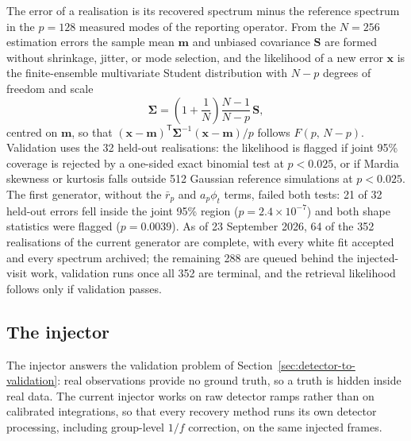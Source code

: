 The error of a realisation is its recovered spectrum minus the reference
spectrum in the $p=128$ measured modes of the reporting operator. From
the $N=256$ estimation errors the sample mean $\bm{m}$ and unbiased
covariance $\bm{S}$ are formed without shrinkage, jitter, or mode
selection, and the likelihood of a new error $\bm{x}$ is the
finite-ensemble multivariate Student distribution with $N-p$ degrees of
freedom and scale
\begin{equation}
 \bm{\Sigma}=\left(1+\frac{1}{N}\right)\frac{N-1}{N-p}\,\bm{S},
 \label{eq:finite-ensemble}
\end{equation}
centred on $\bm{m}$, so that
$(\bm{x}-\bm{m})^{\mathsf T}\bm{\Sigma}^{-1}(\bm{x}-\bm{m})/p$ follows
$F(p,\,N-p)$.
Validation uses the 32 held-out realisations: the likelihood is flagged
if joint 95\% coverage is rejected by a one-sided exact binomial test at
$p<0.025$, or if Mardia skewness or kurtosis falls outside 512 Gaussian
reference simulations at $p<0.025$. The first generator, without the
$\bar r_p$ and $a_p\phi_t$ terms, failed both tests: 21 of 32 held-out
errors fell inside the joint 95\% region ($p=2.4\times10^{-7}$) and both
shape statistics were flagged ($p=0.0039$). As of 23 September 2026, 64 of the 352
realisations of the current generator are complete, with every white fit
accepted and every spectrum archived; the remaining 288 are queued
behind the injected-visit work, validation runs once all 352 are
terminal, and the retrieval likelihood follows only if validation passes.

\subsection{The injector}
\label{sec:injector}


The injector answers the validation problem of
Section~\ref{sec:detector-to-validation}: real observations provide no
ground truth, so a truth is hidden inside real data. The current injector
works on raw detector ramps rather than on calibrated integrations, so
that every recovery method runs its own detector processing, including
group-level $1/f$ correction, on the same injected frames.

